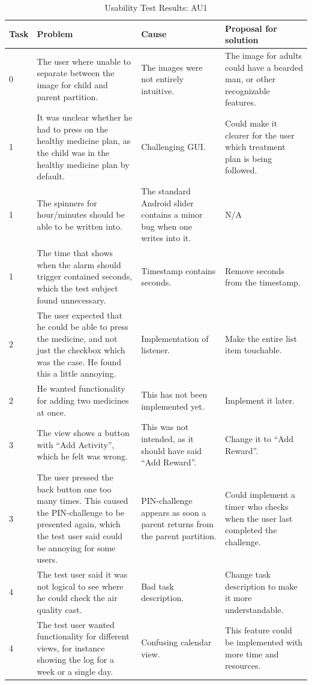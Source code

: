 \begin{singlespacing}
\begin{table}[H]
\centering
\begin{tabular}{| p{1.0cm} | p{4.0cm} | p{4.5cm} | p{4.0cm} |}
\hline
	\textbf{Task} & \textbf{Problem} & \textbf{Cause} & \textbf{Proposal for solution} \\
	\hline
	0 & The user where unable to separate between the image for child and parent partition. & The images were not entirely intuitive. & The image for adults could have a bearded man, or other recognizable features. \\
	\hline
	1 & It was unclear whether he had to press on the healthy medicine plan, as the child was in the healthy medicine plan by default. & Challenging GUI. & Could make it clearer for the user which treatment plan is being followed. \\
	\hline
	1 & The spinners for hour/minutes should be able to be written into. & The standard Android slider contains a minor bug when one writes into it.  & N/A \\
	\hline
	1 & The time that shows when the alarm should trigger contained seconds, which the test subject found unnecessary. & Timestamp contains seconds. & Remove seconds from the timestamp. \\
	\hline
	2 & The user expected that he could be able to press the medicine, and not just the checkbox which was the case. He found this a little annoying. & Implementation of listener. & Make the entire list item touchable. \\
	\hline
	2 & He wanted functionality for adding two medicines at once. & This has not been implemented yet. & Implement it later. \\
	\hline
	3 & The view shows a button with ``Add Activity'', which he felt was wrong. & This was not intended, as it should have said ``Add Reward''. & Change it to ``Add Reward''. \\
	\hline
	3 & The user pressed the back button one too many times. This caused the PIN-challenge to be presented again, which the test user said could be annoying for some users. & PIN-challenge appears as soon a parent returns from the parent partition. & Could implement a timer who checks when the user last completed the challenge.\\
	\hline
	4 & The test user said it was not logical to see where he could check the air quality cast. & Bad task description. & Change task description to make it more understandable. \\
	\hline
	4 & The test user wanted functionality for different views, for instance showing the log for a week or a single day. & Confusing calendar view. & This feature could be implemented with more time and resources.  \\
	\hline
\end{tabular}
\caption{Usability Test Results: AU1}
\label{tab:testadult1}
\end{table}
\end{singlespacing}


